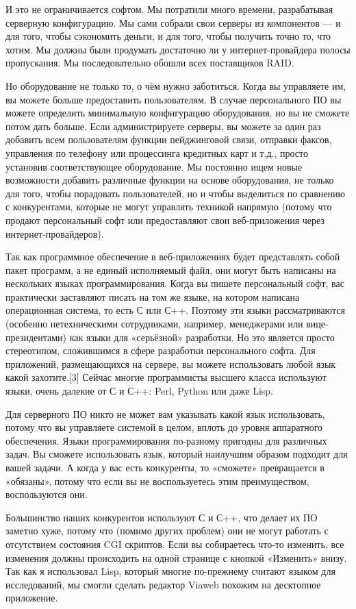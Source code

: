 \documentclass[ebook,12pt,oneside,openany]{memoir}
\begin{document}
И это не ограничивается софтом. Мы потратили много времени,
разрабатывая серверную конфигурацию. Мы сами собрали свои серверы из
компонентов — и для того, чтобы сэкономить деньги, и для того, чтобы
получить точно то, что хотим. Мы должны были продумать достаточно ли у
интернет-провайдера полосы пропускания. Мы последовательно обошли всех
поставщиков RAID.

Но оборудование не только то, о чём нужно заботиться. Когда вы
управляете им, вы можете больше предоставить пользователям. В случае
персонального ПО вы можете определить минимальную конфигурацию
оборудования, но вы не сможете потом дать больше. Если администрируете
серверы, вы можете за один раз добавить всем пользователям функции
пейджинговой связи, отправки факсов, управления по телефону или
процессинга кредитных карт и т.д., просто установив соответствующее
оборудование. Мы постоянно ищем новые возможности добавить различные
функции на основе оборудования, не только для того, чтобы порадовать
пользователей, но и чтобы выделиться по сравнению с конкурентами,
которые не могут управлять техникой напрямую (потому что продают
персональный софт или предоставляют свои веб-приложения через
интернет-провайдеров).

Так как программное обеспечение в веб-приложениях будет представлять
собой пакет программ, а не единый исполняемый файл, они могут быть
написаны на нескольких языках программирования. Когда вы пишете
персональный софт, вас практически заставляют писать на том же языке,
на котором написана операционная система, то есть С или С++. Поэтому
эти языки рассматриваются (особенно нетехническими сотрудниками,
например, менеджерами или вице-президентами) как языки для «серьёзной»
разработки. Но это является просто стереотипом, сложившимся в сфере
разработки персонального софта. Для приложений, размещающихся на
сервере, вы можете использовать любой язык какой захотите.[3] Сейчас
многие программисты высшего класса используют языки, очень далекие от
С и С++: Perl, Python или даже Lisp.

Для серверного ПО никто не может вам указывать какой язык
использовать, потому что вы управляете системой в целом, вплоть до
уровня аппаратного обеспечения. Языки программирования по-разному
пригодны для различных задач. Вы сможете использовать язык, который
наилучшим образом подходит для вашей задачи. А когда у вас есть
конкуренты, то «сможете» превращается в «обязаны», потому что если вы
не воспользуетесь этим преимуществом, воспользуются они.

Большинство наших конкурентов используют С и С++, что делает их ПО
заметно хуже, потому что (помимо других проблем) они не могут работать
с отсутствием состояния CGI скриптов. Если вы собираетесь что-то
изменить, все изменения должны происходить на одной странице с кнопкой
«Изменить» внизу. Так как я использовал Lisp, который многие
по-прежнему считают языком для исследований, мы смогли сделать
редактор Viaweb похожим на десктопное приложение.
\end{document}
